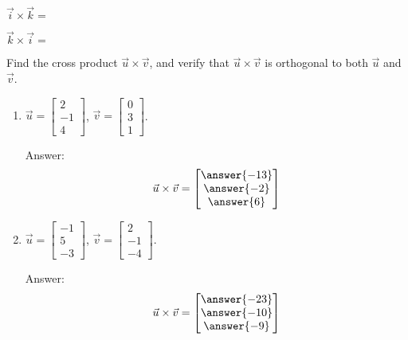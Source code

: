 \documentclass{ximera}
\author{Zack Reed}
\begin{document}
\begin{problem}\label{prob:crossik}
  $\vec{i}\times\vec{k}=$
  \begin{multipleChoice}
    \end{multipleChoice}
  \end{problem}
   
  \begin{problem}\label{prob:crosski}
  $\vec{k}\times\vec{i}=$
  \begin{multipleChoice}
    \end{multipleChoice}
  \end{problem}
   
  \begin{problem} Find the cross product $\vec{u}\times\vec{v}$, and verify that $\vec{u}\times\vec{v}$ is orthogonal to both $\vec{u}$ and $\vec{v}$.
   \begin{enumerate}
  \item $\vec{u}=\begin{bmatrix}2\\-1\\4\end{bmatrix}$, $\vec{v}=\begin{bmatrix}0\\3\\1\end{bmatrix}$.
   
  Answer:
  $$\vec{u}\times\vec{v}=\begin{bmatrix}\answer{-13}\\\answer{-2}\\\answer{6}\end{bmatrix}$$

   
  \item $\vec{u}=\begin{bmatrix}-1\\5\\-3\end{bmatrix}$, $\vec{v}=\begin{bmatrix}2\\-1\\-4\end{bmatrix}$.
   
  Answer:
  $$\vec{u}\times\vec{v}=\begin{bmatrix}\answer{-23}\\\answer{-10}\\\answer{-9}\end{bmatrix}$$
  \end{enumerate}
  \end{problem}
     
\end{document}
